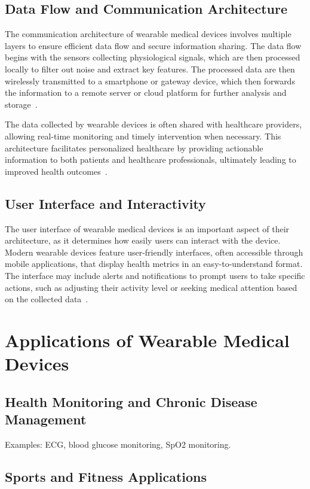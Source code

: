 \documentclass[journal]{IEEEtran}
\begin{document}
    \subsection{Data Flow and Communication Architecture}
    The communication architecture of wearable medical devices involves multiple layers to ensure efficient data flow and secure information sharing. The data flow begins with the sensors collecting physiological signals, which are then processed locally to filter out noise and extract key features. The processed data are then wirelessly transmitted to a smartphone or gateway device, which then forwards the information to a remote server or cloud platform for further analysis and storage~\cite{Saifuzzaman2021}.

    The data collected by wearable devices is often shared with healthcare providers, allowing real-time monitoring and timely intervention when necessary. This architecture facilitates personalized healthcare by providing actionable information to both patients and healthcare professionals, ultimately leading to improved health outcomes~\cite{Guk2019}.

    \subsection{User Interface and Interactivity}
    The user interface of wearable medical devices is an important aspect of their architecture, as it determines how easily users can interact with the device. Modern wearable devices feature user-friendly interfaces, often accessible through mobile applications, that display health metrics in an easy-to-understand format. The interface may include alerts and notifications to prompt users to take specific actions, such as adjusting their activity level or seeking medical attention based on the collected data~\cite{Nahavandi2022}.


\section{Applications of Wearable Medical Devices}
\subsection{Health Monitoring and Chronic Disease Management}

Examples: ECG, blood glucose monitoring, SpO2 monitoring.

\subsection{Sports and Fitness Applications}
\end{document}
